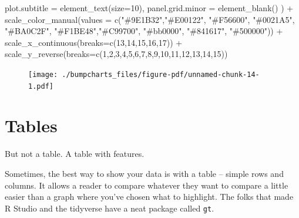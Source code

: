 \documentclass[
  letterpaper,
  DIV=11,
  numbers=noendperiod]{scrreprt}
\newenvironment{Shaded}{\begin{snugshade}}{\end{snugshade}}
\newcommand{\AttributeTok}[1]{\textcolor[rgb]{0.40,0.45,0.13}{#1}}
\newcommand{\DecValTok}[1]{\textcolor[rgb]{0.68,0.00,0.00}{#1}}
\newcommand{\FunctionTok}[1]{\textcolor[rgb]{0.28,0.35,0.67}{#1}}
\newcommand{\NormalTok}[1]{\textcolor[rgb]{0.00,0.23,0.31}{#1}}
\newcommand{\SpecialCharTok}[1]{\textcolor[rgb]{0.37,0.37,0.37}{#1}}
\newcommand{\StringTok}[1]{\textcolor[rgb]{0.13,0.47,0.30}{#1}}
\begin{document}
\begin{Shaded}
\begin{Highlighting}[]
    \AttributeTok{plot.subtitle =} \FunctionTok{element\_text}\NormalTok{(}\AttributeTok{size=}\DecValTok{10}\NormalTok{), }
    \AttributeTok{panel.grid.minor =} \FunctionTok{element\_blank}\NormalTok{()}
\NormalTok{    ) }\SpecialCharTok{+}
  \FunctionTok{scale\_color\_manual}\NormalTok{(}\AttributeTok{values =} \FunctionTok{c}\NormalTok{(}\StringTok{"\#9E1B32"}\NormalTok{,}\StringTok{"\#E00122"}\NormalTok{, }\StringTok{"\#F56600"}\NormalTok{, }\StringTok{"\#0021A5"}\NormalTok{, }\StringTok{"\#BA0C2F"}\NormalTok{, }\StringTok{"\#F1BE48"}\NormalTok{,}\StringTok{"\#C99700"}\NormalTok{, }\StringTok{"\#bb0000"}\NormalTok{, }\StringTok{"\#841617"}\NormalTok{, }\StringTok{"\#500000"}\NormalTok{)) }\SpecialCharTok{+}
  \FunctionTok{scale\_x\_continuous}\NormalTok{(}\AttributeTok{breaks=}\FunctionTok{c}\NormalTok{(}\DecValTok{13}\NormalTok{,}\DecValTok{14}\NormalTok{,}\DecValTok{15}\NormalTok{,}\DecValTok{16}\NormalTok{,}\DecValTok{17}\NormalTok{)) }\SpecialCharTok{+} 
  \FunctionTok{scale\_y\_reverse}\NormalTok{(}\AttributeTok{breaks=}\FunctionTok{c}\NormalTok{(}\DecValTok{1}\NormalTok{,}\DecValTok{2}\NormalTok{,}\DecValTok{3}\NormalTok{,}\DecValTok{4}\NormalTok{,}\DecValTok{5}\NormalTok{,}\DecValTok{6}\NormalTok{,}\DecValTok{7}\NormalTok{,}\DecValTok{8}\NormalTok{,}\DecValTok{9}\NormalTok{,}\DecValTok{10}\NormalTok{,}\DecValTok{11}\NormalTok{,}\DecValTok{12}\NormalTok{,}\DecValTok{13}\NormalTok{,}\DecValTok{14}\NormalTok{,}\DecValTok{15}\NormalTok{))}
\end{Highlighting}
\end{Shaded}

\begin{figure}[H]

{\centering \texttt{[image: ./bumpcharts\_files/figure-pdf/unnamed-chunk-14-1.pdf]}

}

\end{figure}


\hypertarget{tables}{%
\chapter{Tables}\label{tables}}

But not a table. A table with features.

Sometimes, the best way to show your data is with a table -- simple rows
and columns. It allows a reader to compare whatever they want to compare
a little easier than a graph where you've chosen what to highlight. The
folks that made R Studio and the tidyverse have a neat package called
\texttt{gt}.
\end{document}
